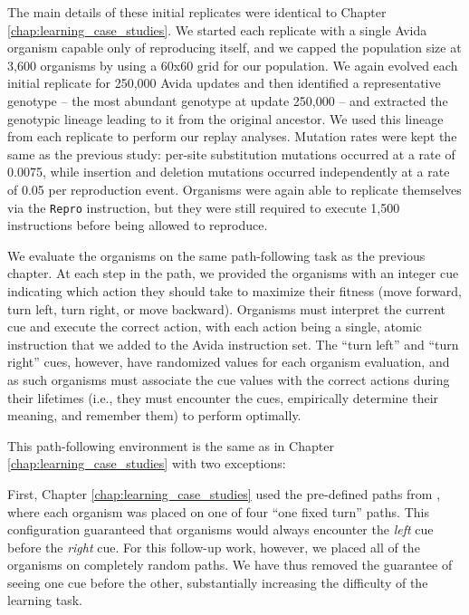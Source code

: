 The main details of these initial replicates were identical to Chapter \ref{chap:learning_case_studies}.
We started each replicate with a single Avida organism capable only of reproducing itself, and we capped the population size at 3,600 organisms by using a 60x60 grid for our population. 
We again evolved each initial replicate for 250,000 Avida updates and then identified a representative genotype -- the most abundant genotype at update 250,000 -- and extracted the genotypic lineage leading to it from the original ancestor. 
We used this lineage from each replicate to perform our replay analyses. 
Mutation rates were kept the same as the previous study: per-site substitution mutations occurred at a rate of 0.0075, while insertion and deletion mutations occurred independently at a rate of 0.05 per reproduction event. 
Organisms  were again able to replicate themselves via the \texttt{Repro} instruction, but they were still required to execute 1,500 instructions before being allowed to reproduce. 

We evaluate the organisms on the same path-following task as the previous chapter. 
At each step in the path, we provided the organisms with an integer cue indicating which action they should take to maximize their fitness (move forward, turn left, turn right, or move backward). 
Organisms must interpret the current cue and execute the correct action, with each action being a single, atomic instruction that we added to the Avida instruction set. 
The ``turn left'' and ``turn right'' cues, however, have randomized values for each organism evaluation, and as such organisms must associate the cue values with the correct actions during their lifetimes (i.e., they must encounter the cues, empirically determine their meaning, and remember them) to perform optimally. 

This path-following environment is the same as in Chapter \ref{chap:learning_case_studies} with two exceptions: 

First, Chapter \ref{chap:learning_case_studies} used the pre-defined paths from \citep{pontesEvolutionaryOriginAssociative2020}, where each organism was placed on one of four ``one fixed turn'' paths. 
This configuration guaranteed that organisms would always encounter the \textit{left} cue before the \textit{right} cue. 
For this follow-up work, however, we placed all of the organisms on completely random paths. 
We have thus removed the guarantee of seeing one cue before the other, substantially increasing the difficulty of the learning task.  

